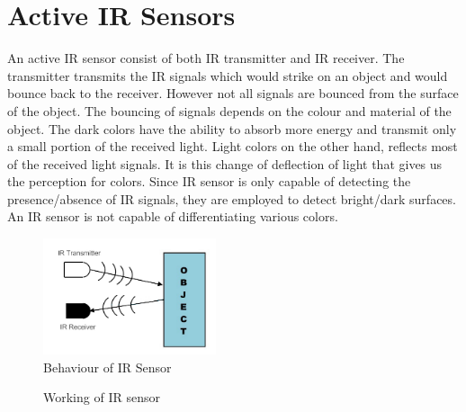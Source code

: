 \section{Active \ac{IR} Sensors}
\par An active \ac{IR} sensor consist of both \ac{IR} transmitter and \ac{IR} receiver. The transmitter transmits the \ac{IR} signals which would strike on an object and would bounce back to the receiver. However not all signals are bounced from the surface of the object. The bouncing of signals depends on the colour and material of the object. The dark colors have the ability to absorb more energy and transmit only a small portion of the received light. Light colors on the other hand, reflects most of the received light signals. It is this change of deflection of light that gives us the perception for colors. Since \ac{IR} sensor is only capable of detecting the presence/absence of \ac{IR} signals, they are employed to detect bright/dark surfaces. An \ac{IR} sensor is not capable of differentiating various colors.

\begin{figure}
	\centering
	\includegraphics[width=2in]{Images/IR Sensor/IR_wave_bouncing.png}
	\caption{Behaviour of \ac{IR} Sensor}
\end{figure}

\begin{figure}
    \centering
    \qquad
    \caption[]{Working of IR sensor}
\end{figure}

